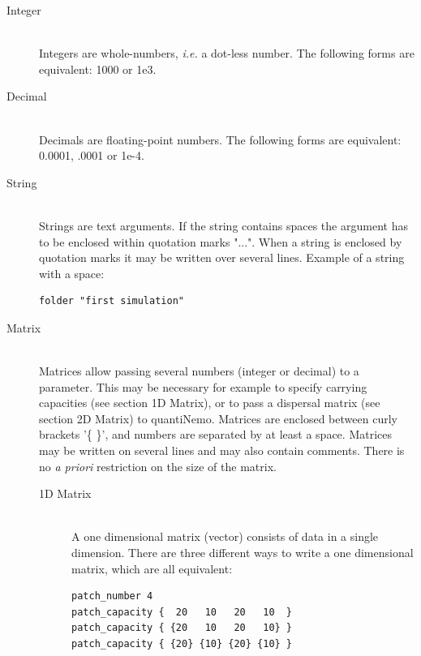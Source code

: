 \documentclass[letterpaper,12pt,oneside]{book}
\begin{document}
\begin{description}
\item[Integer]\hspace*{\fill}\\
Integers are whole-numbers, \textit{i.e.} a dot-less number. The following forms are equivalent: 1000 or 1e3.

\item[Decimal]\hspace*{\fill}\\
Decimals are floating-point numbers. The following forms are equivalent: 0.0001, .0001 or 1e-4.

\item[String]\hspace*{\fill}\\
Strings are text arguments. If the string contains spaces the argument has to be enclosed within quotation marks "...". When a string is enclosed by quotation marks it may be written over several lines. Example of a string with a space:
\begin{lstlisting}[frame=single]
folder "first simulation"
\end{lstlisting}

\item[\label{matparam}Matrix]\hspace*{\fill}\\
Matrices allow passing several numbers (integer or decimal) to a parameter. This may be necessary for example to specify carrying capacities (see section 1D Matrix), or to pass a dispersal matrix (see section 2D Matrix) to quantiNemo. Matrices are enclosed between curly brackets '\{ \}', and numbers are separated by at least a space. Matrices may be written on several lines and may also contain comments. There is no \textit{a priori} restriction on the size of the matrix. 

\begin{description}
\item[1D Matrix]\hspace*{\fill}\\
A one dimensional matrix (vector) consists of data in a single dimension. There are three different ways to write a one dimensional matrix, which are all equivalent:
\begin{lstlisting}[frame=single]
patch_number 4
patch_capacity {  20   10   20   10  }
patch_capacity { {20   10   20   10} }
patch_capacity { {20} {10} {20} {10} }
\end{lstlisting}


\end{description}
\end{description}
\end{document}
